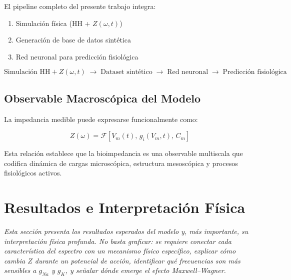 \documentclass[12pt]{article}
\begin{document}
El pipeline completo del presente trabajo integra:

\begin{enumerate}
\item Simulaci\'on f\'isica (HH + $Z(\omega,t)$)

\item Generaci\'on de base de datos sint\'etica
\item Red neuronal para predicci\'on fisiol\'ogica
\end{enumerate}

\begin{equation}
\text{Simulaci\'on HH} + Z(\omega,t)
\;\rightarrow\;
\text{Dataset sint\'etico}
\;\rightarrow\;
\text{Red neuronal}
\;\rightarrow\;
\text{Predicci\'on fisiol\'ogica}
\end{equation}

\subsection{Observable Macrosc\'opica del Modelo}

La impedancia medible puede expresarse funcionalmente como:

\begin{equation}
Z(\omega) =
\mathcal{F}\left[V_m(t),\,g_i(V_m,t),\,C_m\right]
\end{equation}

Esta relaci\'on establece que la bioimpedancia es una observable multiscala que codifica
din\'amica de cargas microsc\'opica, estructura mesosc\'opica y procesos fisiol\'ogicos activos.


\section{Resultados e Interpretaci\'on F\'isica}

\label{sec:results}


\noindent\textit{Esta secci\'on presenta los resultados esperados del modelo y, m\'as importante,
su interpretaci\'on f\'isica profunda. No basta graficar: se requiere conectar cada caracter\'istica
del espectro con un mecanismo f\'isico espec\'ifico, explicar c\'omo cambia $Z$ durante un
potencial de acci\'on, identificar qu\'e frecuencias son m\'as sensibles a $g_{Na}$ y $g_K$, y
se\~{n}alar d\'onde emerge el efecto Maxwell--Wagner.}
\end{document}

